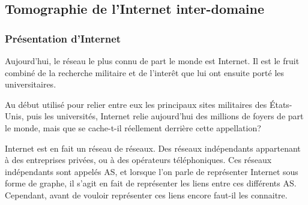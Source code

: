 
% 

\subsection{Tomographie de l'Internet inter-domaine}

\subsubsection{Pr\'esentation d'Internet}

\par
Aujourd'hui, le r\'eseau le plus connu de part le monde est Internet. Il est le fruit combin\'e de la recherche militaire et de l'inter\^et que lui ont ensuite port\'e les universitaires.
\par
Au d\'ebut utilis\'e pour relier entre eux les principaux sites militaires des \'Etats-Unis, puis les universit\'es, Internet relie aujourd'hui des millions de foyers de part le monde, mais que se cache-t-il r\'eellement derri\`ere cette appellation?
\par
Internet est en fait un r\'eseau de r\'eseaux. Des r\'eseaux ind\'ependants appartenant \`a des entreprises priv\'ees, ou à des op\'erateurs t\'el\'ephoniques. Ces r\'eseaux ind\'ependants sont appel\'es AS, et lorsque l'on parle de repr\'esenter Internet sous forme de graphe, il s'agit en fait de repr\'esenter les liens entre ces diff\'erents AS. Cependant, avant de vouloir repr\'esenter ces liens encore faut-il les connaitre.

